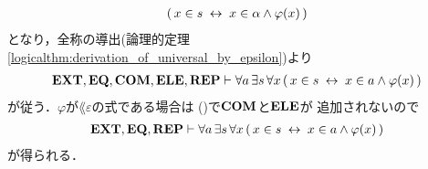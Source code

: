 \begin{sketch}
\begin{description}
\begin{align}
					(\, x \in s \hspace{0.25em}\leftrightarrow\hspace{0.25em} x \in \alpha \wedge \varphi(x)\, )
				\end{align}
				となり，全称の導出(論理的定理\ref{logicalthm:derivation_of_universal_by_epsilon})より
				\begin{align}
					\mbox{{\bf EXT}},\mbox{{\bf EQ}},\mbox{\bf COM},\mbox{{\bf ELE}},\mbox{{\bf REP}} \vdash 
					\forall a\, \exists s\, \forall x\,
					(\, x \in s \hspace{0.25em}\leftrightarrow\hspace{0.25em} x \in a \wedge \varphi(x)\, )
				\end{align}
				が従う．$\varphi$が$\lang{\varepsilon}$の式である場合は
				()で$\mbox{\bf COM}$と$\mbox{{\bf ELE}}$が
				追加されないので
				\begin{align}
					\mbox{{\bf EXT}},\mbox{{\bf EQ}},\mbox{{\bf REP}} \vdash 
					\forall a\, \exists s\, \forall x\,
					(\, x \in s \hspace{0.25em}\leftrightarrow\hspace{0.25em} x \in a \wedge \varphi(x)\, )
				\end{align}
				が得られる．
				\QED
		\end{description}
	\end{sketch}
	
	

